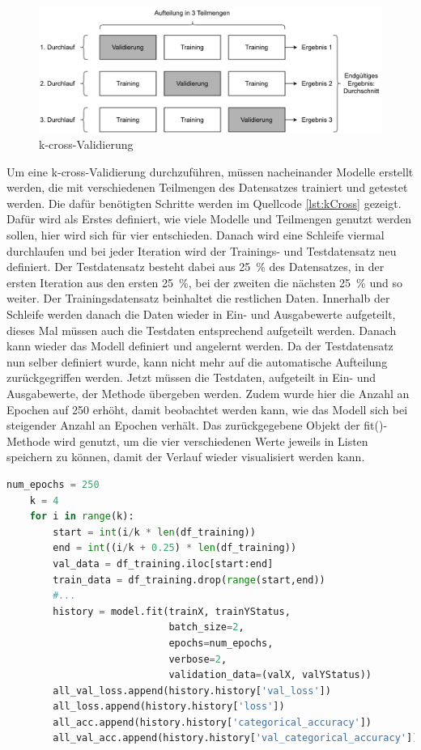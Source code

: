 \begin{figure}[H]
    \centering
    \includegraphics[width = \textwidth]{abbildungen/k_cross.pdf}
    \caption{k-cross-Validierung \cite[vgl. S.122]{DL_PY}}
    \label{fig:kCross}
\end{figure}

Um eine k-cross-Validierung durchzuführen, müssen nacheinander Modelle erstellt werden, die mit verschiedenen Teilmengen des Datensatzes trainiert und getestet werden.
Die dafür benötigten Schritte werden im Quellcode \ref*{lst:kCross} gezeigt.
Dafür wird als Erstes definiert, wie viele Modelle und Teilmengen genutzt werden sollen, hier wird sich für vier entschieden. 
Danach wird eine Schleife viermal durchlaufen und bei jeder Iteration wird der Trainings- und Testdatensatz neu definiert. Der Testdatensatz besteht dabei 
aus 25~\% des Datensatzes, in der ersten Iteration aus den ersten 25~\%, bei der zweiten die nächsten 25~\% und so weiter. Der Trainingsdatensatz beinhaltet die restlichen
Daten. Innerhalb der Schleife werden danach die Daten wieder in Ein- und Ausgabewerte aufgeteilt, dieses Mal müssen auch die Testdaten entsprechend aufgeteilt werden.
Danach kann wieder das Modell definiert und angelernt werden. Da der Testdatensatz nun selber definiert wurde, kann nicht mehr auf die automatische Aufteilung zurückgegriffen werden.
Jetzt müssen die Testdaten, aufgeteilt in Ein- und Ausgabewerte, der Methode übergeben werden. Zudem wurde hier die Anzahl an Epochen auf 250 erhöht, damit beobachtet werden kann,
wie das Modell sich bei steigender Anzahl an Epochen verhält. Das zurückgegebene Objekt der fit()-Methode wird genutzt, um die vier verschiedenen Werte jeweils in Listen speichern 
zu können, damit der Verlauf wieder visualisiert werden kann.
\begin{lstlisting}[language = python, caption={Aufteilung des Datensatzes in Teilmengen},captionpos=b, label = lst:kCross, float, floatplacement=H]
    num_epochs = 250
    k = 4
    for i in range(k):
        start = int(i/k * len(df_training))
        end = int((i/k + 0.25) * len(df_training))
        val_data = df_training.iloc[start:end] 
        train_data = df_training.drop(range(start,end))
        #...
        history = model.fit(trainX, trainYStatus,
                            batch_size=2,
                            epochs=num_epochs,
                            verbose=2,
                            validation_data=(valX, valYStatus))
        all_val_loss.append(history.history['val_loss'])
        all_loss.append(history.history['loss'])
        all_acc.append(history.history['categorical_accuracy'])
        all_val_acc.append(history.history['val_categorical_accuracy'])
\end{lstlisting}


